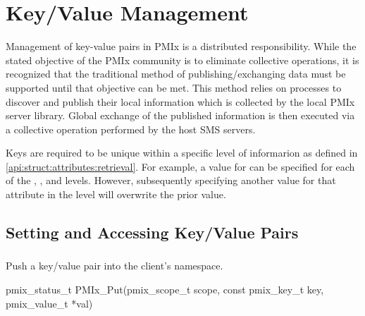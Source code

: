 \chapter{Key/Value Management}
\label{chap:api_kv_mgmt}

Management of key-value pairs in \ac{PMIx} is a distributed responsibility. While the stated objective of the \ac{PMIx} community is to eliminate collective operations, it is recognized that the traditional method of publishing/exchanging data must be supported until that objective can be met. This method relies on processes to discover and publish their local information which is collected by the local PMIx server library.
Global exchange of the published information is then executed via a collective operation performed by the host \ac{SMS} servers.

Keys are required to be unique within a specific level of informarion as defined in \ref{api:struct:attributes:retrieval}. For example, a value for  can be specified for each of the , , and  levels. However, subsequently specifying another value for that attribute in the  level will overwrite the prior value.

\section{Setting and Accessing Key/Value Pairs}
\label{chap:api_kv_mgmt:access}


\subsection{}

\summary

Push a key/value pair into the client's namespace.

\format

\cspecificstart
\begin{codepar}
pmix_status_t
PMIx_Put(pmix_scope_t scope,
         const pmix_key_t key,
         pmix_value_t *val)
\end{codepar}
\cspecificend

\begin{arglist}
\end{arglist}

